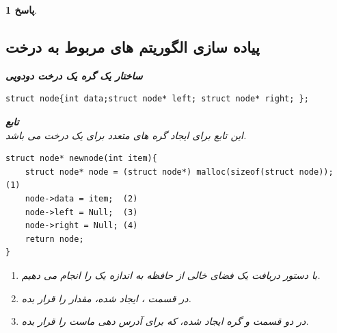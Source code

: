 \documentclass[12pt]{article}
\newtheorem{answer}{پاسخ}[section]
\begin{document}
\begin{answer}
\newpage

\subsection{پیاده سازی الگوریتم های مربوط به درخت}

\textbf{ساختار یک گره یک درخت دودویی}\\
\begin{flushright}
	\begin{latin}
\begin{lstlisting}
struct node{int data;struct node* left; struct node* right; };
\end{lstlisting}
	\end{latin}
\end{flushright}


\textbf{تابع }\\
این تابع برای ایجاد گره های متعدد برای یک درخت می باشد.\\
\begin{flushright}
	\begin{latin}
\begin{lstlisting}
struct node* newnode(int item){
	struct node* node = (struct node*) malloc(sizeof(struct node)); (1)
	node->data = item;  (2)
	node->left = Null;  (3)
	node->right = Null; (4)
	return node;
}
\end{lstlisting}
\end{latin}
\end{flushright}
\begin{enumerate}
	\item[\lr{(1)}]
	با دستور  دریافت یک فضای خالی از حافظه به اندازه یک  را انجام می دهیم.
	\item[\lr{(2)}]
	در قسمت  ،  ایجاد شده، مقدار  را قرار بده.
	\item[\lr{(3,4)}]
	در دو قسمت  و  گره ایجاد شده، که برای آدرس دهی ماست  را قرار بده.\\
\end{enumerate}


\end{answer}
\end{document}
